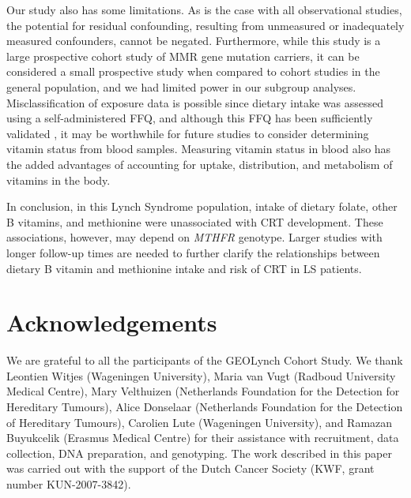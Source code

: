 \noindent Our study also has some limitations. As is the case with all observational studies, the potential for residual confounding, resulting from unmeasured or inadequately measured confounders, cannot be negated. Furthermore, while this study is a large prospective cohort study of MMR gene mutation carriers, it can be considered a small prospective study when compared to cohort studies in the general population, and we had limited power in our subgroup analyses. Misclassification of exposure data is possible since dietary intake was assessed using a self-administered FFQ, and although this FFQ has been sufficiently validated \cite{c628,c629}, it may be worthwhile for future studies to consider determining vitamin status from blood samples. Measuring vitamin status in blood also has the added advantages of accounting for uptake, distribution, and metabolism of vitamins in the body.

\noindent In conclusion, in this Lynch Syndrome population, intake of dietary folate, other B vitamins, and methionine were unassociated with CRT development. These associations, however, may depend on \emph{MTHFR} genotype. Larger studies with longer follow-up times are needed to further clarify the relationships between dietary B vitamin and methionine intake and risk of CRT in LS patients. 

\section*{Acknowledgements} 
We are grateful to all the participants of the GEOLynch Cohort Study. We thank Leontien Witjes (Wageningen University), Maria van Vugt (Radboud University Medical Centre), Mary Velthuizen (Netherlands Foundation for the Detection for Hereditary Tumours), Alice Donselaar (Netherlands Foundation for the Detection of Hereditary Tumours), Carolien Lute (Wageningen University), and Ramazan Buyukcelik (Erasmus Medical Centre) for their assistance with recruitment, data collection, DNA preparation, and genotyping. The work described in this paper was carried out with the support of the Dutch Cancer Society (KWF, grant number KUN-2007-3842). 
 
